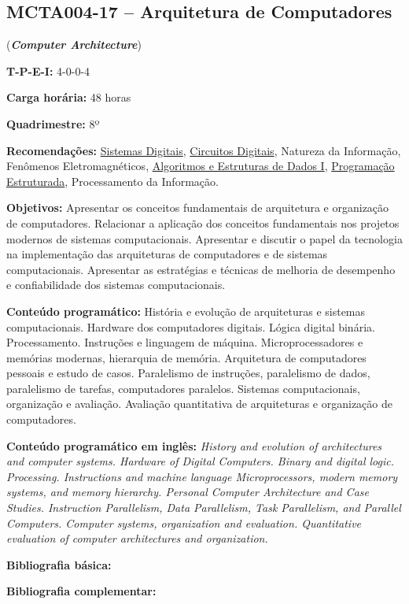 \documentclass[class=article, crop=false]{standalone}
\begin{document}
\subsection*{MCTA004-17 -- Arquitetura de Computadores}
\label{disc:arq}

(\textbf{\textit{Computer Architecture}})

\begin{center}
    \begin{minipage}{0.85\textwidth}
        \textbf{T-P-E-I:} 4-0-0-4
        
        \textbf{Carga horária:} 48 horas
        
        \textbf{Quadrimestre:} 8º
        
        \textbf{Recomendações:} 
        \hyperref[disc:sist_dig]{Sistemas Digitais},
        \hyperref[disc:circ_dig]{Circuitos Digitais},
        Natureza da Informação,
        Fenômenos Eletromagnéticos, 
        \hyperref[disc:aedI]{Algoritmos e Estruturas de Dados I},
        \hyperref[disc:pe]{Programação Estruturada},
        Processamento da Informação.
    \end{minipage}
\end{center}

\textbf{Objetivos:}
Apresentar os conceitos fundamentais de arquitetura e organização de
computadores.
Relacionar a aplicação dos conceitos fundamentais nos projetos modernos de
sistemas computacionais.
Apresentar e discutir o papel da tecnologia na implementação das arquiteturas
de computadores e de sistemas computacionais.
Apresentar as estratégias e técnicas de melhoria de desempenho e confiabilidade
dos sistemas computacionais.


\textbf{Conteúdo programático:}
História e evolução de arquiteturas e sistemas computacionais.
Hardware dos computadores digitais.
Lógica digital binária.
Processamento.
Instruções e linguagem de máquina.
Microprocessadores e memórias modernas, hierarquia de memória.
Arquitetura de computadores pessoais e estudo de casos.
Paralelismo de instruções, paralelismo de dados, paralelismo de tarefas,
computadores paralelos.
Sistemas computacionais, organização e avaliação.
Avaliação quantitativa de arquiteturas e organização de computadores.

\textbf{Conteúdo programático em inglês:} 
\textit{History and evolution of architectures and computer systems.
Hardware of Digital Computers.
Binary and digital logic. 
Processing.
Instructions and machine language
Microprocessors, modern memory systems, and memory hierarchy.
Personal Computer Architecture and Case Studies.
Instruction Parallelism, Data Parallelism, Task Parallelism, and Parallel Computers.
Computer systems, organization and evaluation.
Quantitative evaluation of computer architectures and organization.}

\newrefsection
\textbf{Bibliografia básica:}
\nocite{2010-stallings, 2013-tanenbaum, 2014-patterson}
\printbibliography

\newrefsection
\textbf{Bibliografia complementar:}
\nocite{2013-hennessy, 2021-nilsan, 2010-null, 2013-harris, 2005-dantas}
\printbibliography
\end{document}
